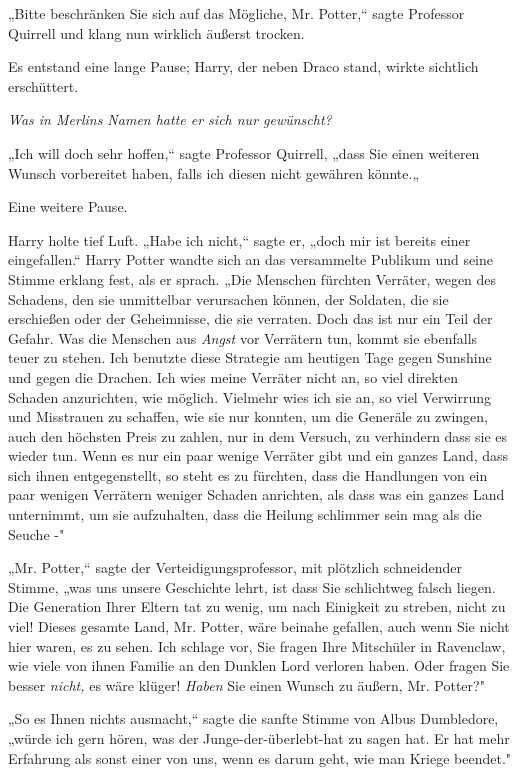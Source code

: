{„Bitte beschränken Sie sich auf das Mögliche, Mr. Potter,“ sagte Professor Quirrell und klang nun wirklich äußerst trocken.

Es entstand eine lange Pause; Harry, der neben Draco stand, wirkte sichtlich erschüttert.

\emph{Was in Merlins Namen hatte er sich nur gewünscht?}

„Ich will doch sehr hoffen,“ sagte Professor Quirrell, „dass Sie einen weiteren Wunsch vorbereitet haben, falls ich diesen nicht gewähren könnte.„

Eine weitere Pause.

Harry holte tief Luft. „Habe ich nicht,“ sagte er, „doch mir ist bereits einer eingefallen.“ Harry Potter wandte sich an das versammelte Publikum und seine Stimme erklang fest, als er sprach. „Die Menschen fürchten Verräter, wegen des Schadens, den sie unmittelbar verursachen können, der Soldaten, die sie erschießen oder der Geheimnisse, die sie verraten. Doch das ist nur ein Teil der Gefahr. Was die Menschen aus \emph{Angst} vor Verrätern tun, kommt sie ebenfalls teuer zu stehen. Ich benutzte diese Strategie am heutigen Tage gegen Sunshine und gegen die Drachen. Ich wies meine Verräter nicht an, so viel direkten Schaden anzurichten, wie möglich. Vielmehr wies ich sie an, so viel Verwirrung und Misstrauen zu schaffen, wie sie nur konnten, um die Generäle zu zwingen, auch den höchsten Preis zu zahlen, nur in dem Versuch, zu verhindern dass sie es wieder tun. Wenn es nur ein paar wenige Verräter gibt und ein ganzes Land, dass sich ihnen entgegenstellt, so steht es zu fürchten, dass die Handlungen von ein paar wenigen Verrätern weniger Schaden anrichten, als dass was ein ganzes Land unternimmt, um sie aufzuhalten, dass die Heilung schlimmer sein mag als die Seuche -"

„Mr. Potter,“ sagte der Verteidigungsprofessor, mit plötzlich schneidender Stimme, „was uns unsere Geschichte lehrt, ist dass Sie schlichtweg falsch liegen. Die Generation Ihrer Eltern tat zu wenig, um nach Einigkeit zu streben, nicht zu viel! Dieses gesamte Land, Mr. Potter, wäre beinahe gefallen, auch wenn Sie nicht hier waren, es zu sehen. Ich schlage vor, Sie fragen Ihre Mitschüler in Ravenclaw, wie viele von ihnen Familie an den Dunklen Lord verloren haben. Oder fragen Sie besser \emph{nicht,} es wäre klüger! \emph{Haben} Sie einen Wunsch zu äußern, Mr. Potter?"

„So es Ihnen nichts ausmacht,“ sagte die sanfte Stimme von Albus Dumbledore, „würde ich gern hören, was der Junge-der-überlebt-hat zu sagen hat. Er hat mehr Erfahrung als sonst einer von uns, wenn es darum geht, wie man Kriege beendet."

}
